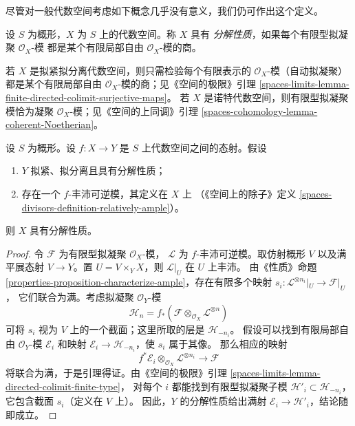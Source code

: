 \medskip\noindent
尽管对一般代数空间考虑如下概念几乎没有意义，我们仍可作出这个定义。

\begin{definition}
\label{definition-resolution-property}
设 $S$ 为概形，$X$ 为 $S$ 上的代数空间。称 $X$ 具有
{\it 分解性质}，如果每个有限型拟凝聚 $\mathcal{O}_X$-模
都是某个有限局部自由 $\mathcal{O}_X$-模的商。
\end{definition}

\noindent
若 $X$ 是拟紧拟分离代数空间，则只需检验每个有限表示的
$\mathcal{O}_X$-模（自动拟凝聚）都是某个有限局部自由
$\mathcal{O}_X$-模的商；见《空间的极限》引理 %
\ref{spaces-limits-lemma-finite-directed-colimit-surjective-maps}。
若 $X$ 是诺特代数空间，则有限型拟凝聚模恰为凝聚
$\mathcal{O}_X$-模；见《空间的上同调》引理
\ref{spaces-cohomology-lemma-coherent-Noetherian}。

\begin{lemma}
\label{lemma-resolution-property-ample-relative}
设 $S$ 为概形。设 $f : X \to Y$ 是 $S$ 上代数空间之间的态射。假设
\begin{enumerate}
\item $Y$ 拟紧、拟分离且具有分解性质；
\item 存在一个 $f$-丰沛可逆模，其定义在 $X$ 上
（《空间上的除子》定义
\ref{spaces-divisors-definition-relatively-ample}）。
\end{enumerate}
则 $X$ 具有分解性质。
\end{lemma}

\begin{proof}
令 $\mathcal{F}$ 为有限型拟凝聚 $\mathcal{O}_X$-模，
$\mathcal{L}$ 为 $f$-丰沛可逆模。取仿射概形 $V$ 以及满平展态射
$V \to Y$。置 $U = V \times_Y X$，则 $\mathcal{L}|_U$ 在 $U$ 上丰沛。
由《性质》命题
\ref{properties-proposition-characterize-ample}，存在有限多个映射 %
$s_i : \mathcal{L}^{\otimes n_i}|_U \to \mathcal{F}|_U$，
它们联合为满。考虑拟凝聚 $\mathcal{O}_Y$-模
$$
\mathcal{H}_n =
f_*(\mathcal{F} \otimes_{\mathcal{O}_X} \mathcal{L}^{\otimes n})
$$
可将 $s_i$ 视为 $V$ 上的一个截面；这里所取的层是
$\mathcal{H}_{-n_i}$。
假设可以找到有限局部自由 $\mathcal{O}_Y$-模 $\mathcal{E}_i$ 和映射
$\mathcal{E}_i \to \mathcal{H}_{-n_i}$，使 $s_i$ 属于其像。
那么相应的映射
$$
f^*\mathcal{E}_i
\otimes_{\mathcal{O}_X}
\mathcal{L}^{\otimes n_i} \longrightarrow \mathcal{F}
$$
将联合为满，于是引理得证。由《空间的极限》引理
\ref{spaces-limits-lemma-directed-colimit-finite-type}，
对每个 $i$ 都能找到有限型拟凝聚子模
$\mathcal{H}'_i \subset  \mathcal{H}_{-n_i}$，
它包含截面 $s_i$（定义在 $V$ 上）。
因此，$Y$ 的分解性质给出满射
$\mathcal{E}_i \to \mathcal{H}'_i$，结论随即成立。
\end{proof}

